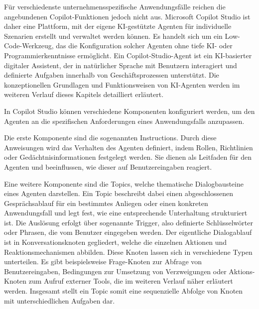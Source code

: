 Für verschiedenste unternehmensspezifische Anwendungsfälle reichen die angebundenen Copilot-Funktionen jedoch nicht aus. Microsoft Copilot Studio ist daher eine Plattform, mit der eigene \ac{KI}-gestützte Agenten für individuelle Szenarien erstellt und verwaltet werden können. Es handelt sich um ein Low-Code-Werkzeug, das die Konfiguration solcher Agenten ohne tiefe \ac{KI}- oder Programmierkenntnisse ermöglicht. Ein Copilot-Studio-Agent ist ein \ac{KI}-basierter digitaler Assistent, der in natürlicher Sprache mit Benutzern interagiert und definierte Aufgaben innerhalb von Geschäftsprozessen unterstützt. \cite{iaanw_overview_2025}
Die konzeptionellen Grundlagen und Funktionsweisen von \ac{KI}-Agenten werden im weiteren Verlauf dieses Kapitels detailliert erläutert.

In Copilot Studio können verschiedene Komponenten konfiguriert werden, um den Agenten an die spezifischen Anforderungen eines Anwendungsfalls anzupassen. 

Die erste Komponente sind die sogenannten Instructions. Durch diese Anweisungen wird das Verhalten des Agenten definiert, indem Rollen, Richtlinien oder Gedächtnisinformationen festgelegt werden. Sie dienen als Leitfaden für den Agenten und beeinflussen, wie dieser auf Benutzereingaben reagiert. \cite{noauthor_copilot_nodate}

Eine weitere Komponente sind die Topics, welche thematische Dialogbausteine eines Agenten darstellen. Ein Topic beschreibt dabei einen abgeschlossenen Gesprächsablauf für ein bestimmtes Anliegen oder einen konkreten Anwendungsfall und legt fest, wie eine entsprechende Unterhaltung strukturiert ist. Die Auslösung erfolgt über sogenannte Trigger, also definierte Schlüsselwörter oder Phrasen, die vom Benutzer eingegeben werden. Der eigentliche Dialogablauf ist in Konversationsknoten gegliedert, welche die einzelnen Aktionen und Reaktionsmechanismen abbilden. Diese Knoten lassen sich in verschiedene Typen unterteilen. Es gibt beispielsweise Frage-Knoten zur Abfrage von Benutzereingaben, Bedingungen zur Umsetzung von Verzweigungen oder Aktions-Knoten zum Aufruf externer Tools, die im weiteren Verlauf näher erläutert werden. Insgesamt stellt ein Topic somit eine sequenzielle Abfolge von Knoten mit unterschiedlichen Aufgaben dar. \cite{henryjammes_topics_2025}

